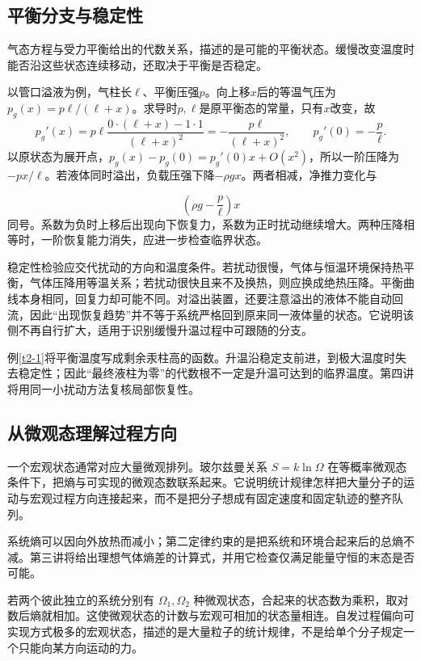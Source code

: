 

\subsection{平衡分支与稳定性}
气态方程与受力平衡给出的代数关系，描述的是可能的平衡状态。缓慢改变温度时能否沿这些状态连续移动，还取决于平衡是否稳定。

以管口溢液为例，气柱长$\ell$、平衡压强$p$。向上移$x$后的等温气压为$p_g(x)=p\ell/(\ell+x)$。求导时$p,\ell$是原平衡态的常量，只有$x$改变，故
\[
p_g'(x)=p\ell\frac{0\cdot(\ell+x)-1\cdot1}{(\ell+x)^2}
=-\frac{p\ell}{(\ell+x)^2},\qquad p_g'(0)=-\frac p\ell.
\]
以原状态为展开点，$p_g(x)-p_g(0)=p_g'(0)x+O(x^2)$，所以一阶压降为$-px/\ell$。若液体同时溢出，负载压强下降$-\rho gx$。两者相减，净推力变化与

\[\left(\rho g-\frac p\ell\right)x
\]
同号。系数为负时上移后出现向下恢复力，系数为正时扰动继续增大。两种压降相等时，一阶恢复能力消失，应进一步检查临界状态。

稳定性检验应交代扰动的方向和温度条件。若扰动很慢，气体与恒温环境保持热平衡，气体压降用等温关系；若扰动很快且来不及换热，则应换成绝热压降。平衡曲线本身相同，回复力却可能不同。对溢出装置，还要注意溢出的液体不能自动回流，因此“出现恢复趋势”并不等于系统严格回到原来同一液体量的状态。它说明该侧不再自行扩大，适用于识别缓慢升温过程中可跟随的分支。

例\ref{t2-1}将平衡温度写成剩余汞柱高的函数。升温沿稳定支前进，到极大温度时失去稳定性；因此“最终液柱为零”的代数根不一定是升温可达到的临界温度。第四讲将用同一小扰动方法复核局部恢复性。

\subsection{从微观态理解过程方向}
一个宏观状态通常对应大量微观排列。玻尔兹曼关系 $S=k\ln\Omega$ 在等概率微观态条件下，把熵与可实现的微观态数联系起来。它说明统计规律怎样把大量分子的运动与宏观过程方向连接起来，而不是把分子想成有固定速度和固定轨迹的整齐队列。

系统熵可以因向外放热而减小；第二定律约束的是把系统和环境合起来后的总熵不减。第三讲将给出理想气体熵差的计算式，并用它检查仅满足能量守恒的末态是否可能。


若两个彼此独立的系统分别有 $\Omega_1,\Omega_2$ 种微观状态，合起来的状态数为乘积，取对数后熵就相加。这使微观状态的计数与宏观可相加的状态量相连。自发过程偏向可实现方式极多的宏观状态，描述的是大量粒子的统计规律，不是给单个分子规定一个只能向某方向运动的力。


